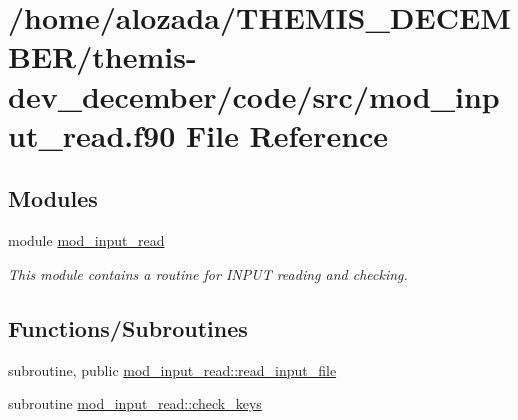 \hypertarget{mod__input__read_8f90}{}\section{/home/alozada/\+T\+H\+E\+M\+I\+S\+\_\+\+D\+E\+C\+E\+M\+B\+E\+R/themis-\/dev\+\_\+december/code/src/mod\+\_\+input\+\_\+read.f90 File Reference}
\label{mod__input__read_8f90}
\subsection*{Modules}
\begin{DoxyCompactItemize}
\item 
module \hyperlink{namespacemod__input__read}{mod\+\_\+input\+\_\+read}
\begin{DoxyCompactList}\small\item\em This module contains a routine for I\+N\+P\+UT reading and checking. \end{DoxyCompactList}\end{DoxyCompactItemize}
\subsection*{Functions/\+Subroutines}
\begin{DoxyCompactItemize}
\item 
subroutine, public \hyperlink{namespacemod__input__read_ae27abd188ee109221a29ed77b68fb6d9}{mod\+\_\+input\+\_\+read\+::read\+\_\+input\+\_\+file}
\item 
subroutine \hyperlink{namespacemod__input__read_a396026faa10ab3698196930dfb90690b}{mod\+\_\+input\+\_\+read\+::check\+\_\+keys}
\end{DoxyCompactItemize}
